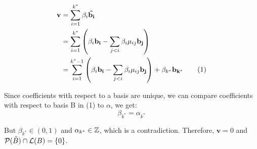\begin{align*}
    \mathbf{v} &= \sum_{i=1}^{k^*} \beta_i \mathbf{\Tilde{b_i}} \\
    &= \sum_{i=1}^{k^*}\left(\beta_i \mathbf{b_i} - \sum_{j < i} \beta_i \mu_{ij} \mathbf{b_j} \right) \\
    &= \sum_{i=1}^{k^*-1}\left(\beta_i \mathbf{b_i} - \sum_{j < i} \beta_i \mu_{ij} \mathbf{b_j} \right) + \beta_{k^*}\mathbf{b_{k^*}}  \tag{1}
\end{align*}

Since coefficients with respect to a basis are unique, we can compare coefficients with respect to basis B in (1) to $\alpha$, we get:
\[
\beta_{k^*} = \alpha_{k^*}
\]

But $\beta_{k^*} \in (0, 1)$ and $\alpha_{k^*} \in \mathbb{Z}$, which is a contradiction.
Therefore, $\mathbf{v} = 0$ and $\mathcal{P}(\Tilde{B}) \cap \mathcal{L}(B) = \{0\}$.